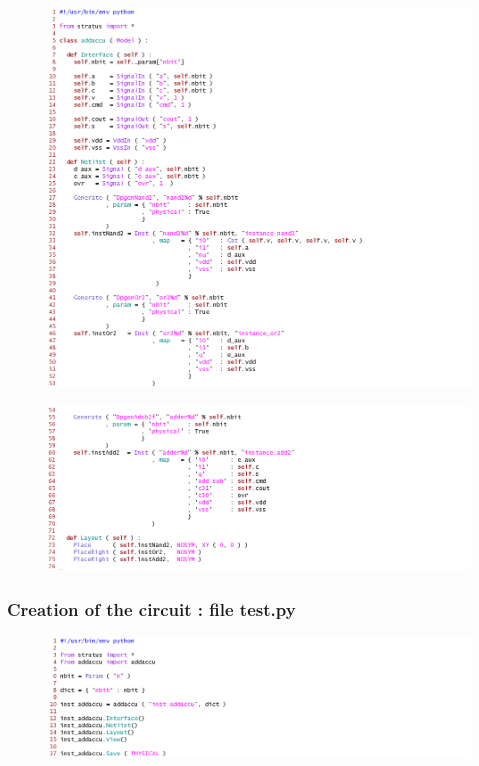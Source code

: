 \begin{figure}[h!]
\centering
\includegraphics[width=1.4\textwidth]{./images/addaccu1}
\end{figure}

\begin{figure}[h!]
\centering
\includegraphics[width=1.4\textwidth]{./images/addaccu2}
\end{figure}

\newpage
\subsubsection{Creation of the circuit : file test.py}

\begin{figure}[h!]
\centering
\includegraphics[width=1.4\textwidth]{./images/test}
\end{figure}

